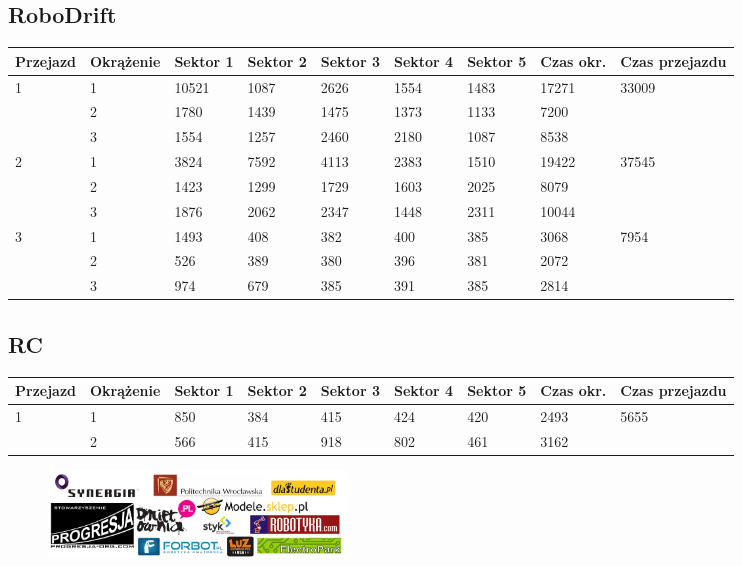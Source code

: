 \documentclass[11pt]{article}
\begin{document}
\subsection{RoboDrift}
\begin{table}[h]
\begin{tabular}{|l|l|l|l|l|l|l|l|l|}
\hline
   Przejazd        & Okrążenie & Sektor 1 & Sektor 2 & Sektor 3 & Sektor 4 & Sektor 5 & Czas okr. & Czas przejazdu    \\ \hline
\multirow{3}{*}{1}& 1 &10521& 1087& 2626& 1554& 1483& 17271& \multirow{3}{*}{33009} \\ \cline{2-8}
& 2& 1780& 1439& 1475& 1373& 1133& 7200& \\ \cline{2-8}
& 3& 1554& 1257& 2460& 2180& 1087& 8538& \\ \hline
\multirow{3}{*}{2}& 1 &3824& 7592& 4113& 2383& 1510& 19422& \multirow{3}{*}{37545} \\ \cline{2-8}
& 2& 1423& 1299& 1729& 1603& 2025& 8079& \\ \cline{2-8}
& 3& 1876& 2062& 2347& 1448& 2311& 10044& \\ \hline
\multirow{3}{*}{3}& 1 &1493& 408& 382& 400& 385& 3068& \multirow{3}{*}{7954} \\ \cline{2-8}
& 2& 526& 389& 380& 396& 381& 2072& \\ \cline{2-8}
& 3& 974& 679& 385& 391& 385& 2814& \\ \hline
\end{tabular}
\end{table}
\subsection{RC}
\begin{table}[h]
\begin{tabular}{|l|l|l|l|l|l|l|l|l|}
\hline
 Przejazd        & Okrążenie & Sektor 1 & Sektor 2 & Sektor 3 & Sektor 4 & Sektor 5 & Czas okr. & Czas przejazdu    \\ \hline
\multirow{2}{*}{1}& 1 &850& 384& 415& 424& 420& 2493& \multirow{2}{*}{5655} \\ \cline{2-8}
& 2& 566& 415& 918& 802& 461& 3162& \\ \hline
\end{tabular}
\end{table}
\clearpage
\newpage
\begin{figure}
\centering
\includegraphics[width=300px, keepaspectratio=true]
{images/sponsors.jpg}
\end{figure}
\end{document}
